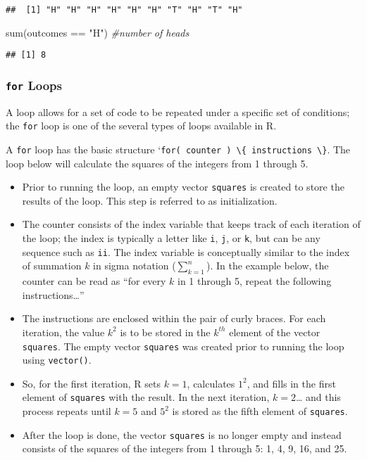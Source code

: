 \documentclass[
]{article}
\newenvironment{Shaded}{\begin{snugshade}}{\end{snugshade}}
\newcommand{\CommentTok}[1]{\textcolor[rgb]{0.56,0.35,0.01}{\textit{#1}}}
\newcommand{\FunctionTok}[1]{\textcolor[rgb]{0.00,0.00,0.00}{#1}}
\newcommand{\NormalTok}[1]{#1}
\newcommand{\SpecialCharTok}[1]{\textcolor[rgb]{0.00,0.00,0.00}{#1}}
\newcommand{\StringTok}[1]{\textcolor[rgb]{0.31,0.60,0.02}{#1}}
\begin{document}
\begin{verbatim}
##  [1] "H" "H" "H" "H" "H" "H" "T" "H" "T" "H"
\end{verbatim}

\begin{Shaded}
\begin{Highlighting}[]
\FunctionTok{sum}\NormalTok{(outcomes }\SpecialCharTok{==} \StringTok{"H"}\NormalTok{)  }\CommentTok{\#number of heads}
\end{Highlighting}
\end{Shaded}

\begin{verbatim}
## [1] 8
\end{verbatim}

\hypertarget{for-loops}{%
\subsubsection{\texorpdfstring{\texttt{for}
Loops}{for Loops}}\label{for-loops}}

A loop allows for a set of code to be repeated under a specific set of
conditions; the \texttt{for} loop is one of the several types of loops
available in R.

A \texttt{for} loop has the basic structure
`\texttt{for(\ counter\ )\ \textbackslash{}\{\ instructions\ \textbackslash{}\}}.
The loop below will calculate the squares of the integers from 1 through
5.

\begin{itemize}
\item
  Prior to running the loop, an empty vector \texttt{squares} is created
  to store the results of the loop. This step is referred to as
  initialization.
\item
  The counter consists of the index variable that keeps track of each
  iteration of the loop; the index is typically a letter like
  \texttt{i}, \texttt{j}, or \texttt{k}, but can be any sequence such as
  \texttt{ii}. The index variable is conceptually similar to the index
  of summation \(k\) in sigma notation (\(\sum_{k = 1}^n\)). In the
  example below, the counter can be read as ``for every \(k\) in 1
  through 5, repeat the following instructions\ldots{}''
\item
  The instructions are enclosed within the pair of curly braces. For
  each iteration, the value \(k^2\) is to be stored in the \(k^{th}\)
  element of the vector \texttt{squares}. The empty vector
  \texttt{squares} was created prior to running the loop using
  \texttt{vector()}.
\item
  So, for the first iteration, R sets \(k = 1\), calculates \(1^2\), and
  fills in the first element of \texttt{squares} with the result. In the
  next iteration, \(k = 2\)\ldots{} and this process repeats until
  \(k = 5\) and \(5^2\) is stored as the fifth element of
  \texttt{squares}.
\item
  After the loop is done, the vector \texttt{squares} is no longer empty
  and instead consists of the squares of the integers from 1 through 5:
  1, 4, 9, 16, and 25.
\end{itemize}
\end{document}
